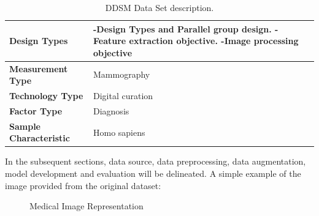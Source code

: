 \documentclass{book}
\begin{document}
        
        \begin{table}
            \begin{tabular}{m{5cm}m{8cm}}
                \midrule
                \textbf{Design Types} & -Design Types and Parallel group design.  -Feature extraction objective.  -Image processing objective \\
                \midrule
                \textbf{Measurement Type} & Mammography \\ 
                \midrule
                \textbf{Technology Type} & Digital curation \\ 
                \midrule
                \textbf{Factor Type} & Diagnosis \\
                \midrule
                \textbf{Sample Characteristic} & Homo sapiens\\
                \midrule
            \end{tabular}
            \caption{\label{tab:DDSM}DDSM Data Set description.}
        \end{table}

        In the subsequent sections, data source, data preprocessing, data augmentation, model development and evaluation will be delineated. A simple example of the image provided from the original dataset:

        \begin{figure}[H]
            \hfill
            \hfill
            \hfill
            \hfill
            \caption{Medical Image Representation}
        \end{figure}
\end{document}
